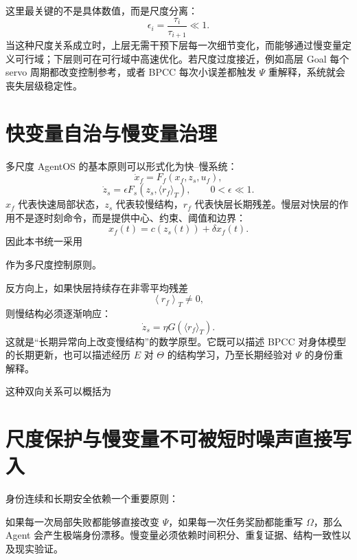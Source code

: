 这里最关键的不是具体数值，而是尺度分离：
\[
\epsilon_i=
\frac{\tau_i}{\tau_{i+1}}
\ll1.
\]
当这种尺度关系成立时，上层无需干预下层每一次细节变化，而能够通过慢变量定义可行域；下层则可在可行域中高速优化。若尺度过度接近，例如高层 Goal 每个 servo 周期都改变控制参考，或者 BPCC 每次小误差都触发 $\Psi$ 重解释，系统就会丧失层级稳定性。

\section{快变量自治与慢变量治理}

多尺度 AgentOS 的基本原则可以形式化为快--慢系统：
\[
\dot x_f
=
F_f(x_f,z_s,u_f),
\]
\[
\dot z_s
=
\epsilon F_s(z_s,\langle r_f\rangle_T),
\qquad
0<\epsilon\ll1.
\]
$x_f$ 代表快速局部状态，$z_s$ 代表较慢结构，$r_f$ 代表快层长期残差。慢层对快层的作用不是逐时刻命令，而是提供中心、约束、阈值和边界：
\[
x_f(t)
=
c(z_s(t))
+
\delta x_f(t).
\]
因此本书统一采用
\begin{statementbox}
\centering
{}
\end{statementbox}
作为多尺度控制原则。

反方向上，如果快层持续存在非零平均残差
\[
\left\langle r_f\right\rangle_T\neq0,
\]
则慢结构必须逐渐响应：
\[
\dot z_s
=
\eta G(\langle r_f\rangle_T).
\]
这就是“长期异常向上改变慢结构”的数学原型。它既可以描述 BPCC 对身体模型的长期更新，也可以描述经历 $E$ 对 $\Theta$ 的结构学习，乃至长期经验对 $\Psi$ 的身份重解释。

这种双向关系可以概括为
\begin{statementbox}
\centering
{}
\end{statementbox}

\section{尺度保护与慢变量不可被短时噪声直接写入}

身份连续和长期安全依赖一个重要原则：
\begin{statementbox}
\centering
{}
\end{statementbox}
如果每一次局部失败都能够直接改变 $\Psi$，如果每一次任务奖励都能重写 $\Omega$，那么 Agent 会产生极端身份漂移。慢变量必须依赖时间积分、重复证据、结构一致性以及现实验证。

